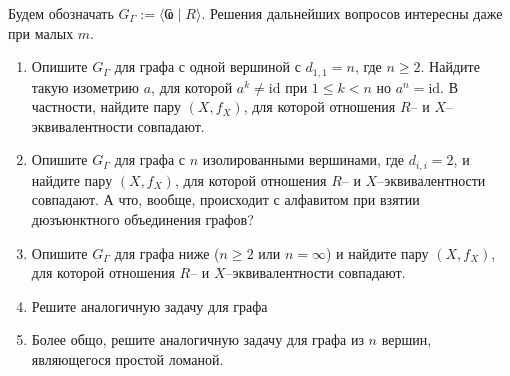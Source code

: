 \begin{enumerate}
Будем обозначать $G_\Gamma := \langle \text{Ҩ} \mid R \rangle$. Решения дальнейших вопросов интересны даже при малых $m$.
\begin{enumerate}
\item Опишите $G_\Gamma$ для графа с одной вершиной с $d_{1,1} = n$, где $n \geq 2$.
Найдите такую изометрию $a$, для которой $a^{k} \neq \textrm{id}$ при $1 \leq k < n$ но $a^n = \textrm{id}$. В частности, найдите пару $(X,f_X)$, для которой отношения $R$-- и $X$--эквивалентности совпадают.
\item Опишите $G_\Gamma$ для графа с $n$ изолированными вершинами, где $d_{i,i} = 2$, и найдите пару $(X,f_X)$, для которой отношения $R$-- и $X$--эквивалентности совпадают. А что, вообще, происходит с алфавитом при взятии дюзъюнктного объединения графов?
\item Опишите $G_\Gamma$ для графа ниже ($n \geq 2$ или $n=\infty$) и найдите пару $(X,f_X)$, для которой отношения $R$-- и $X$--эквивалентности совпадают.

\begin{center}
\end{center}
\item Решите аналогичную задачу для графа
\begin{center}
\end{center}
\item Более общо, решите аналогичную задачу для графа из $n$ вершин, являющегося простой ломаной.
\begin{center}
\begin{tikzpicture}[-,>=stealth',shorten >=1pt,auto,node distance=2cm,
                thick,main node/.style={circle,draw,font=\Large\bfseries}]


\end{tikzpicture}
\end{center}
\end{enumerate}
\end{enumerate}
